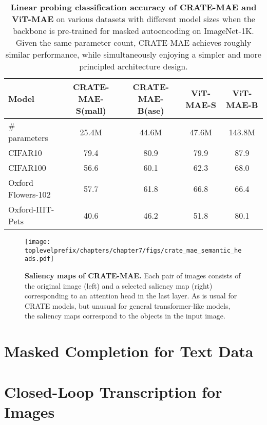 \documentclass[../../book-main.tex]{subfiles}
\begin{document}
\begin{table}
    \centering 
    \begin{tabular}{@{}lcc|cc@{}}
        \toprule 
        \textbf{Model} & CRATE-MAE-S(mall) & CRATE-MAE-B(ase) & {\color{gray} ViT-MAE-S} & {\color{gray} ViT-MAE-B} \\
        \midrule
        \midrule
        \# parameters & 25.4M & 44.6M & 47.6M & {\color{gray}143.8M} \\
        \midrule
        CIFAR10 & 79.4 & 80.9 & {\color{gray} 79.9} & {\color{gray} 87.9} \\
        CIFAR100 & 56.6 & 60.1 & {\color{gray} 62.3} & {\color{gray} 68.0} \\
        Oxford Flowers-102 & 57.7 & 61.8 & {\color{gray} 66.8} & {\color{gray} 66.4} \\
        Oxford-IIIT-Pets & 40.6 & 46.2 & {\color{gray} 51.8} & {\color{gray} 80.1} \\
        \bottomrule
    \end{tabular}
    \caption{\small\textbf{Linear probing classification accuracy of CRATE-MAE and ViT-MAE} on various datasets with different model sizes when the backbone is pre-trained for masked autoencoding on ImageNet-1K. Given the same parameter count, CRATE-MAE achieves roughly similar performance, while simultaneously enjoying a simpler and more principled architecture design.}
    \label{tab:crate_mae_linear_probing}
\end{table}

\begin{figure}
    \centering 
    \texttt{[image: \\toplevelprefix/chapters/chapter7/figs/crate\_mae\_semantic\_heads.pdf]}
    \caption{\small\textbf{Saliency maps of CRATE-MAE.} Each pair of images consists of the original image (left) and a selected saliency map (right) corresponding to an attention head in the last layer. As is usual for CRATE models, but unusual for general transformer-like models, the saliency maps correspond to the objects in the input image.}
    \label{fig:crate_mae_semantic_heads}
\end{figure}

\section{Masked Completion for Text Data}\label{sec:text_completion}

\section{Closed-Loop Transcription for Images}\label{sec:ctrl}
\end{document}
